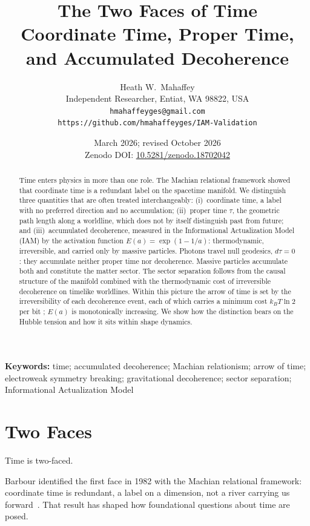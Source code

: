 \documentclass[12pt,a4paper]{article}
\title{\textbf{The Two Faces of Time}\\
\large Coordinate Time, Proper Time, and Accumulated Decoherence}
\author{Heath W.\ Mahaffey\\
\small Independent Researcher, Entiat, WA 98822, USA\\
\small \texttt{hmahaffeyges@gmail.com}\\
\small \texttt{https://github.com/hmahaffeyges/IAM-Validation}}
\date{March 2026; revised October 2026\\
\small Zenodo DOI:
\href{https://doi.org/10.5281/zenodo.18702042}{10.5281/zenodo.18702042}}
\begin{document}
\maketitle

\begin{abstract}
Time enters physics in more than one role. The Machian relational framework
\citep{BarbourBertotti1982} showed that coordinate time is a redundant label on
the spacetime manifold. We distinguish three quantities that are often treated
interchangeably: (i)~coordinate time, a label with no preferred direction and no
accumulation; (ii)~proper time $\tau$, the geometric path length along a
worldline, which does not by itself distinguish past from future; and
(iii)~accumulated decoherence, measured in the Informational Actualization Model
(IAM) by the activation function $E(a)=\exp(1-1/a)$: thermodynamic, irreversible,
and carried only by massive particles. Photons travel null geodesics, $d\tau=0$:
they accumulate neither proper time nor decoherence. Massive particles accumulate
both and constitute the matter sector. The sector separation follows from the
causal structure of the manifold combined with the thermodynamic cost of
irreversible decoherence on timelike worldlines. Within this picture the arrow of
time is set by the irreversibility of each decoherence event, each of which carries
a minimum cost $k_BT\ln2$ per bit \citep{Landauer1961}; $E(a)$ is monotonically
increasing. We show how the distinction bears on the Hubble tension and how it sits
within shape dynamics.
\end{abstract}

\noindent\textbf{Keywords:} time; accumulated decoherence; Machian relationism; arrow of
time; electroweak symmetry breaking; gravitational decoherence; sector
separation; Informational Actualization Model

\section{Two Faces}
\label{sec:twofaces}

Time is two-faced.

Barbour identified the first face in 1982 with the Machian relational
framework: coordinate time is redundant, a label on a dimension, not a
river carrying us forward~\citep{BarbourBertotti1982}. That result
has shaped how foundational questions about time are posed.
\end{document}
